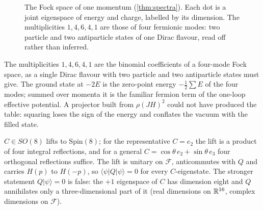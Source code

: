 \begin{figure}[t]
\centering
{}
\caption{The Fock space of one momentum (\cref{thm:spectra}). Each dot is a joint eigenspace of energy and charge, labelled by its
dimension. The multiplicities $1,4,6,4,1$ are those of four fermionic modes: two particle and two antiparticle states of one Dirac
flavour, read off rather than inferred.}
\label{fig:fock}
\end{figure}

The multiplicities $1,4,6,4,1$ are the binomial coefficients of a four-mode Fock space, as a single Dirac flavour with two particle and
two antiparticle states must give. The ground state at $-2E$ is the zero-point energy $-\tfrac12\sum E$ of the four modes; summed over
momenta it is the familiar fermion term of the one-loop effective potential. A projector built from $\rho(JH)^2$ could not have
produced the table: squaring loses the sign of the energy and conflates the vacuum with the filled state.

\begin{proposition}
\label{prop:Cstates}
$C\in SO(8)$ lifts to $\mathrm{Spin}(8)$; for the representative $C=e_2$ the lift is a product of four integral reflections, and for a
general $C=\cos\theta\,e_2+\sin\theta\,e_3$ four orthogonal reflections suffice. The lift is unitary on $\mathcal F$, anticommutes with
$Q$ and carries $H(p)$ to $H(-p)$, so $\langle\psi|Q|\psi\rangle=0$ for every $C$-eigenstate. The stronger statement $Q|\psi\rangle=0$ is
false: the $+1$ eigenspace of $C$ has dimension eight and $Q$ annihilates only a three-dimensional part of it (real dimensions on $\mathbb{R}^{16}$,
complex dimensions on $\mathcal F$).
\end{proposition}

